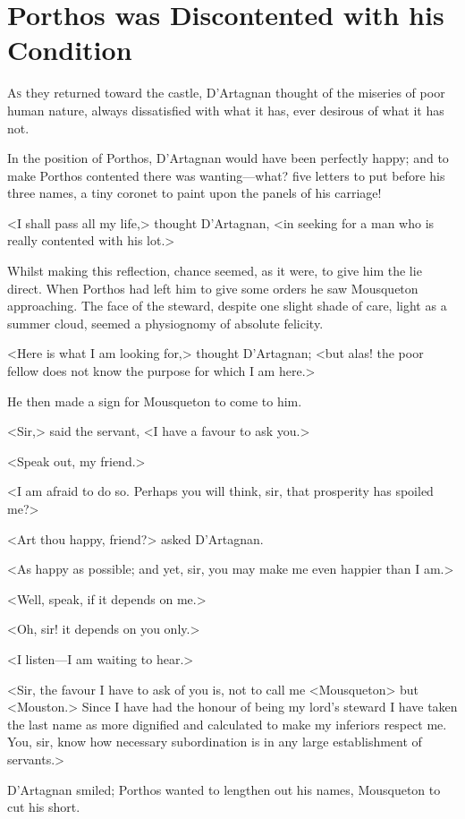 \chapter{Porthos was Discontented with his Condition}

 \lettrine{A}{s} they returned toward the castle, D'Artagnan thought of the miseries of poor human nature, always dissatisfied with what it has, ever desirous of what it has not.

\zz
In the position of Porthos, D'Artagnan would have been perfectly happy; and to make Porthos contented there was wanting—what? five letters to put before his three names, a tiny coronet to paint upon the panels of his carriage!

<I shall pass all my life,> thought D'Artagnan, <in seeking for a man who is really contented with his lot.>

Whilst making this reflection, chance seemed, as it were, to give him the lie direct. When Porthos had left him to give some orders he saw Mousqueton approaching. The face of the steward, despite one slight shade of care, light as a summer cloud, seemed a physiognomy of absolute felicity.

<Here is what I am looking for,> thought D'Artagnan; <but alas! the poor fellow does not know the purpose for which I am here.>

He then made a sign for Mousqueton to come to him.

<Sir,> said the servant, <I have a favour to ask you.>

<Speak out, my friend.>

<I am afraid to do so. Perhaps you will think, sir, that prosperity has spoiled me?>

<Art thou happy, friend?> asked D'Artagnan.

<As happy as possible; and yet, sir, you may make me even happier than I am.>

<Well, speak, if it depends on me.>

<Oh, sir! it depends on you only.>

<I listen—I am waiting to hear.>

<Sir, the favour I have to ask of you is, not to call me <Mousqueton> but <Mouston.> Since I have had the honour of being my lord's steward I have taken the last name as more dignified and calculated to make my inferiors respect me. You, sir, know how necessary subordination is in any large establishment of servants.>

D'Artagnan smiled; Porthos wanted to lengthen out his names, Mousqueton to cut his short.

